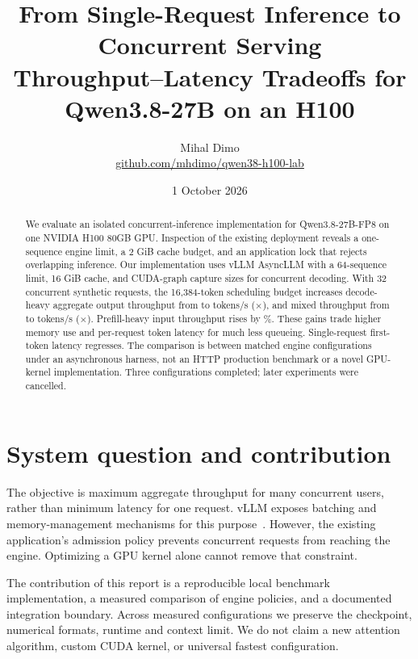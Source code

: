 \documentclass[10pt,a4paper]{article}
\title{\vspace{-12mm}\textbf{From Single-Request Inference to Concurrent Serving}\\[3pt]
\large Throughput--Latency Tradeoffs for Qwen3.8-27B on an H100}
\author{Mihal Dimo\\\small\href{https://github.com/mhdimo/qwen38-h100-lab}{github.com/mhdimo/qwen38-h100-lab}}
\date{1 October 2026}
\begin{document}
\maketitle\thispagestyle{fancy}
\vspace{-6mm}
\begin{abstract}
We evaluate an isolated concurrent-inference implementation for Qwen3.8-27B-FP8
on one NVIDIA H100 80GB GPU. Inspection of the existing deployment reveals
a one-sequence engine limit, a 2 GiB cache budget, and an application lock that
rejects overlapping inference. Our implementation uses vLLM AsyncLLM with a
64-sequence limit, 16 GiB cache, and CUDA-graph capture sizes for concurrent
decoding. With 32 concurrent synthetic requests, the 16,384-token scheduling
budget increases decode-heavy aggregate output throughput from
\BaseDecode{} to \LargeDecode{} tokens/s (\DecodeSpeedup{}$\times$), and mixed
throughput from \BaseMixed{} to \LargeMixed{} tokens/s (\MixedSpeedup{}$\times$).
Prefill-heavy input throughput rises by \PrefillGain{}\%.
These gains trade higher memory use and per-request token latency for much less
queueing. Single-request first-token latency regresses. The comparison is between
matched engine configurations under an asynchronous harness, not an HTTP
production benchmark or a novel GPU-kernel implementation. Three configurations
completed; later experiments were cancelled.
\end{abstract}

\section{System question and contribution}
The objective is maximum aggregate throughput for many concurrent users, rather
than minimum latency for one request. vLLM exposes batching and memory-management
mechanisms for this purpose~\cite{pagedattention}. However, the existing
application's admission policy prevents concurrent requests from reaching the
engine. Optimizing a GPU kernel alone cannot remove that constraint.

The contribution of this report is a reproducible local benchmark implementation,
a measured comparison of engine policies, and a documented integration boundary.
Across measured configurations we preserve the checkpoint, numerical formats,
runtime and context limit. We do not claim a new attention algorithm, custom CUDA kernel, or universal
fastest configuration.
\end{document}
